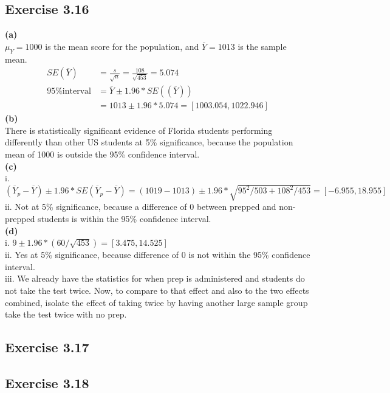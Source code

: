 \documentclass[fleqn]{article}
\begin{document}
\begin{adjustwidth}{-2cm}{-2cm}
\subsection{Exercise 3.16}
\textbf{(a)}\\
$\mu_{Y} = 1000$ is the mean score for the population, and $\overline{Y} = 1013$ is the sample mean.
\begin{align*}
SE\left(\overline{Y}\right) &= \frac{s}{\sqrt{n}} = \frac{108}{\sqrt{453}} = 5.074\\
\text{95\% interval} &= \overline{Y} \pm 1.96*SE\left(\left(\overline{Y}\right)\right)\\
&= 1013 \pm 1.96*5.074 = [1003.054, 1022.946]
\end{align*}
\textbf{(b)}\\
There is statistically significant evidence of Florida students performing differently than other US students at 5\% significance, because the population mean of 1000 is outside the 95\% confidence interval.\\
\textbf{(c)}\\
\null\quad i. $(\overline{Y}_{p}-\overline{Y}) \pm 1.96*SE(\overline{Y}_{p}-\overline{Y}) = (1019-1013) \pm 1.96*\sqrt{95^{2}/503 + 108^{2}/453} = [-6.955, 18.955]$\\
\null\quad ii. Not at 5\% significance, because a difference of 0 between prepped and non-prepped students is within the 95\% confidence interval.\\
\textbf{(d)}\\
\null\quad i. $9 \pm 1.96*(60/\sqrt{453}) = [3.475, 14.525]$\\
\null\quad ii. Yes at 5\% significance, because difference of 0 is not within the 95\% confidence interval.\\
\null\quad iii. We already have the statistics for when prep is administered and students do not take the test twice. \null\quad\null\quad Now, to compare to that effect and also to the two effects combined, isolate the effect of taking twice \null\quad\null\quad by having another large sample group take the test twice with no prep.\\
\subsection{Exercise 3.17}

\subsection{Exercise 3.18}


\end{adjustwidth}
\end{document}
